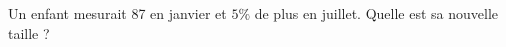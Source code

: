 
\begin{exercice}\label{exosmath-0117}

    Un enfant mesurait \unit{87}{\centi\meter} en janvier et \( 5\%\) de plus en juillet. Quelle est sa nouvelle taille ?

\end{exercice}
